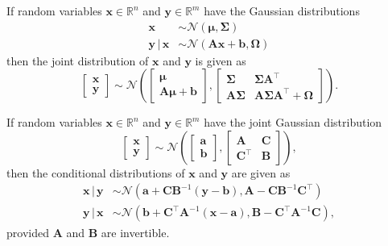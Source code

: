\begin{proposition} \label{prop: joint}
	If random variables ${\bm x} \in \mathbb R^n$ and ${\bm y} \in \mathbb R^m$ have the Gaussian distributions
	\begin{equation}
		\begin{aligned}
			\bm x &\sim \mathcal N \left( {\bm \mu}, {\bm \Sigma} \right) \\
			\bm y \, \vert \, \bm x &\sim \mathcal N \left( {\bm A} {\bm x} + {\bm b}, {\bm \Omega} \right)
		\end{aligned}
	\end{equation}
	then the joint distribution of ${\bm x}$ and ${\bm y}$ is given as
		\begin{equation}
			\begin{bmatrix} {\bm x} \\ {\bm y} \end{bmatrix} \sim 
				\mathcal{N} \left( 
					\begin{bmatrix} 
						{\bm \mu} \\ {\bm A} {\bm \mu} + {\bm b} 
					\end{bmatrix}, 
					\begin{bmatrix}
						{\bm \Sigma} & {\bm \Sigma} {\bm A}^{\top} \\ 
						{\bm A} {\bm \Sigma} & {\bm A} {\bm \Sigma} {\bm A}^{\top} + {\bm \Omega}
					\end{bmatrix}
				\right).
		\end{equation}
\end{proposition}

\begin{proposition} \label{prop: cond}
	If random variables ${\bm x} \in \mathbb R^n$ and ${\bm y} \in \mathbb R^m$ have the joint Gaussian distribution
	\begin{equation}
		\begin{bmatrix} {\bm x} \\ {\bm y} \end{bmatrix} \sim 
		\mathcal N \left(
			\begin{bmatrix} {\bm a} \\ {\bm b} \end{bmatrix}, 
			\begin{bmatrix} {\bm A} & {\bm C} \\ {\bm C}^{\top} & {\bm B} \end{bmatrix}
		\right),
	\end{equation}
	then the conditional distributions of ${\bm x}$ and ${\bm y}$ are given as
	\begin{align}
		{\bm x} \, \vert \, {\bm y} &\sim \mathcal N \left( {\bm a} + {\bm C} {\bm B}^{-1} \left( {\bm y} - {\bm b} \right), {\bm A} - {\bm C} {\bm B}^{-1} {\bm C}^{\top} \right) \\
		{\bm y} \, \vert \, {\bm x} &\sim \mathcal N \left( {\bm b} + {\bm C}^{\top} {\bm A}^{-1} \left( {\bm x} - {\bm a} \right), {\bm B} - {\bm C}^{\top} {\bm A}^{-1} {\bm C} \right),
	\end{align}
	provided ${\bm A}$ and ${\bm B}$ are invertible.
\end{proposition}


